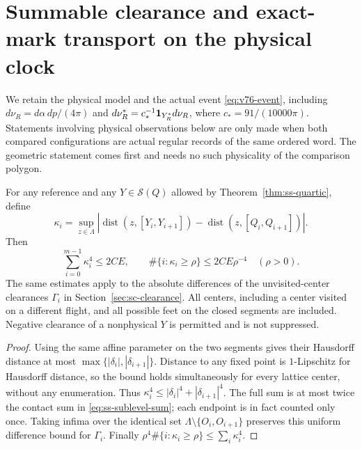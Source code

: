 \section{Summable clearance and exact-mark transport on the physical clock}
\label{sec:ss-transport}
We retain the physical model and the actual event \eqref{eq:v76-event},
including $d\nu_R=d\alpha\,dp/(4\pi)$ and
$d\nu_R^*=c_*^{-1}\mathbf1_{Y_R^*}d\nu_R$, where
$c_*=91/(10000\pi)$. Statements involving physical observations below
are only made when both compared configurations are actual regular
records of the same ordered word. The geometric statement comes first
and needs no such physicality of the comparison polygon.

\begin{theorem}
\label{thm:ss-clearance-sum}
For any reference and any $Y\in\mathcal S(Q)$ allowed by
Theorem~\ref{thm:ss-quartic}, define
\[
 \kappa_i=\sup_{z\in\Lambda}
 \left|\operatorname{dist}(z,[Y_i,Y_{i+1}])-
              \operatorname{dist}(z,[Q_i,Q_{i+1}])\right|.
\]
Then
\begin{equation}\label{eq:ss-clearance-sum}
 \sum_{i=0}^{m-1}\kappa_i^4\le2CE,\qquad
 \#\{i:\kappa_i\ge\rho\}\le2CE\rho^{-4}\quad(\rho>0).
\end{equation}
The same estimates apply to the absolute differences of the
unvisited-center clearances $\Gamma_i$ in
Section~\ref{sec:sc-clearance}. All centers, including a center
visited on a different flight, and all possible feet on the closed
segments are included. Negative clearance of a nonphysical $Y$ is
permitted and is not suppressed.
\end{theorem}
\begin{proof}
Using the same affine parameter on the two segments gives their
Hausdorff distance at most $\max\{|\delta_i|,|\delta_{i+1}|\}$.
Distance to any fixed point is $1$-Lipschitz for Hausdorff distance,
so the bound holds simultaneously for every lattice center, without
any enumeration. Thus
$\kappa_i^4\le|\delta_i|^4+|\delta_{i+1}|^4$.
The full sum is at most twice the contact sum in
\eqref{eq:ss-sublevel-sum}; each endpoint is in fact counted only
once. Taking infima over the identical set
$\Lambda\setminus\{O_i,O_{i+1}\}$ preserves this uniform difference
bound for $\Gamma_i$. Finally
$\rho^4\#\{i:\kappa_i\ge\rho\}\le\sum_i\kappa_i^4$.
\end{proof}

